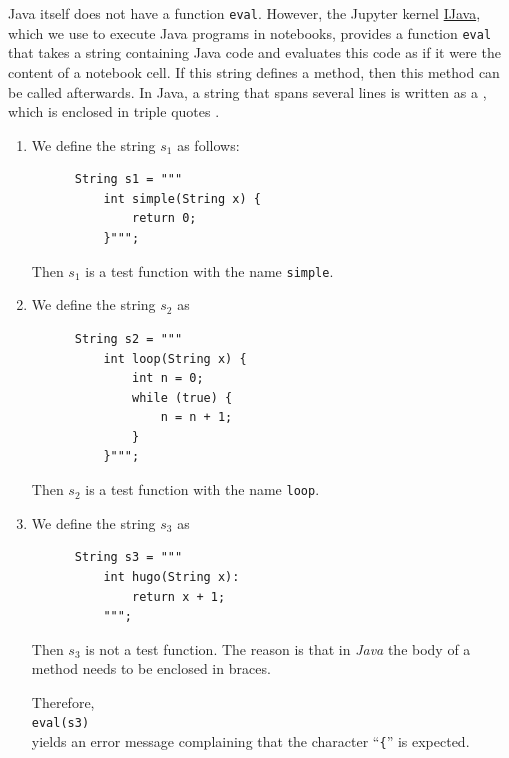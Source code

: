 \noindent
Java itself does not have a function \texttt{eval}.  However, the Jupyter kernel
\href{https://github.com/SpencerPark/IJava}{IJava}, which we use to execute Java programs in notebooks,
provides a function \texttt{eval} that takes a string containing Java code and evaluates this code as if it
were the content of a notebook cell.  If this string defines a method, then this method can be called
afterwards.  In Java, a string that spans several lines is written as a , which is
enclosed in triple quotes \texttt{}.

\examplesEng
\begin{enumerate}
\item We define the string $s_1$ as follows:
      \begin{verbatim}
      String s1 = """
          int simple(String x) {
              return 0;
          }""";
      \end{verbatim}
      \vspace*{-0.8cm}

      Then $s_1$ is a test function with the name \texttt{simple}.
\item We define the string $s_2$ as
      \begin{verbatim}
      String s2 = """
          int loop(String x) {
              int n = 0;
              while (true) {
                  n = n + 1;
              }
          }""";
      \end{verbatim}
      \vspace*{-0.8cm}

      Then $s_2$ is a test function with the name \texttt{loop}.
\item We define the string $s_3$ as
      \begin{verbatim}
      String s3 = """
          int hugo(String x):
              return x + 1;
          """;
      \end{verbatim}
      \vspace*{-0.8cm}

      Then $s_3$ is not a test function.
      The reason is that in \textsl{Java} the body of a method needs to be enclosed in braces.

      Therefore, 
      \\[0.2cm]
      \hspace*{1.3cm}
      \texttt{eval(s3)}
      \\[0.2cm]
      yields an error message complaining that the character ``\texttt{\{}'' is expected.
\end{enumerate}
